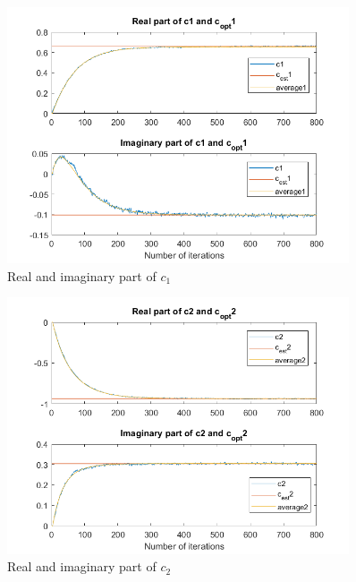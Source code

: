 \documentclass[a4paper, 12pt]{report}
\begin{document}
\begin{figure}[H]
	\centering
	
	\includegraphics[width=0.9\textwidth]{c1_1real}
	
	\caption{Real and imaginary part of $c_1$}
	\label{fig:coeff1}
\end{figure}


\begin{figure}[H]
	\centering
		\includegraphics[width=0.9\textwidth]{c2_1real}
	\caption{Real and imaginary part of $c_2$}
	\label{fig:coeff2}
\end{figure}
\end{document}
